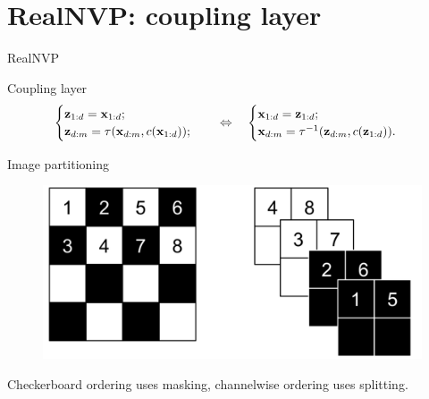 \section{RealNVP: coupling layer}
\begin{frame}{RealNVP}
	\begin{block}{Coupling layer}
		\vspace{-0.8cm}
		\begin{equation*}
			\begin{cases} \mathbf{z}_{1:d} = \mathbf{x}_{1:d}; \\ \mathbf{z}_{d:m} = \tau (\mathbf{x}_{d:m}, c(\mathbf{x}_{1:d}));\end{cases} 
			\quad \Leftrightarrow \quad 
			\begin{cases} \mathbf{x}_{1:d} = \mathbf{z}_{1:d}; \\ \mathbf{x}_{d:m} = \tau^{-1} (\mathbf{z}_{d:m}, c(\mathbf{z}_{1:d})).\end{cases}
		\end{equation*}
		\vspace{-0.5cm}
	\end{block}
	\begin{block}{Image partitioning}
		\begin{figure}
			\centering
			\includegraphics[width=0.65\linewidth]{figs/realnvp_masking.png}
		\end{figure}
	\end{block}
	\vspace{-0.5cm}
	
	Checkerboard ordering uses masking, channelwise ordering uses splitting.
\end{frame}

